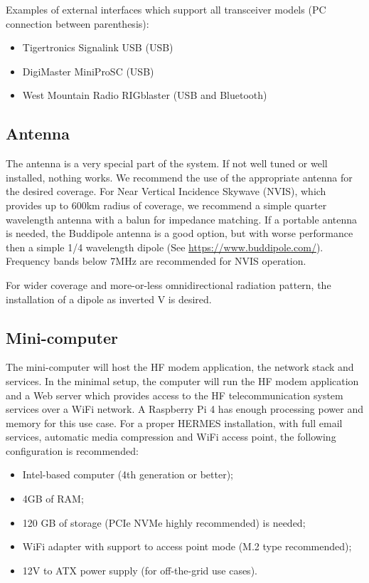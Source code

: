 \documentclass[11pt,a4paper]{article}
\begin{document}
Examples of external interfaces which support all transceiver
models (PC connection between parenthesis):
\begin{itemize}
\item Tigertronics Signalink USB (USB)
\item DigiMaster MiniProSC (USB)
\item West Mountain Radio RIGblaster (USB and Bluetooth)
\end{itemize}

\subsection{Antenna}

The antenna is a very special part of the system. If not well tuned or well
installed, nothing works. We recommend the use of the appropriate antenna
for the desired coverage. For Near Vertical Incidence Skywave (NVIS), which
provides up to 600km radius of coverage, we recommend a simple quarter wavelength
antenna with a balun for impedance matching. If a portable antenna is
needed, the Buddipole antenna is a good option, but with worse performance
then a simple 1/4 wavelength dipole (See
\url{https://www.buddipole.com/}). Frequency bands below 7MHz are
recommended for NVIS operation.

For wider coverage and more-or-less omnidirectional radiation pattern, the
installation of a dipole as inverted V is desired.

\subsection{Mini-computer}

The mini-computer will host the HF modem application, the network
stack and services. In the minimal setup, the computer will run the HF
modem application and a Web server which provides access to the HF
telecommunication system services over a WiFi network. A Raspberry Pi 4 has
enough processing power and memory for this use case. For a proper HERMES
installation, with full email services, automatic media compression and WiFi
access point, the following configuration is recommended:

\begin{itemize}
\item Intel-based computer (4th generation or better);
\item 4GB of RAM;
\item 120 GB of storage (PCIe NVMe highly recommended) is needed;
\item WiFi adapter with support to access point mode (M.2 type recommended);
\item 12V to ATX power supply (for off-the-grid use cases).
\end{itemize}
\end{document}
